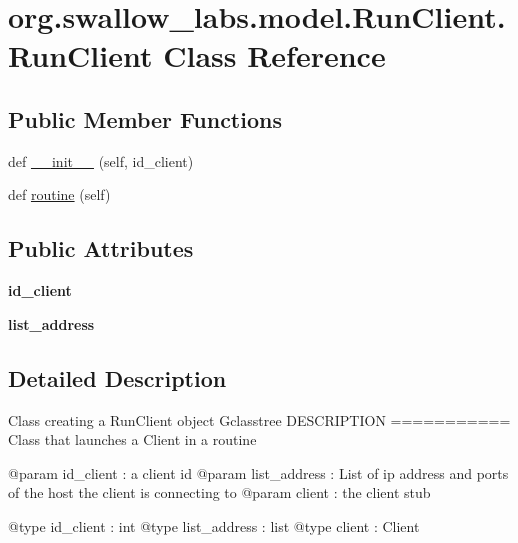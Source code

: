 \hypertarget{classorg_1_1swallow__labs_1_1model_1_1_run_client_1_1_run_client}{}\section{org.\+swallow\+\_\+labs.\+model.\+Run\+Client.\+Run\+Client Class Reference}
\label{classorg_1_1swallow__labs_1_1model_1_1_run_client_1_1_run_client}
\subsection*{Public Member Functions}
\begin{DoxyCompactItemize}
\item 
def \hyperlink{classorg_1_1swallow__labs_1_1model_1_1_run_client_1_1_run_client_a81ec48b20543e3646635882056c0e719}{\+\_\+\+\_\+init\+\_\+\+\_\+} (self, id\+\_\+client)
\item 
def \hyperlink{classorg_1_1swallow__labs_1_1model_1_1_run_client_1_1_run_client_ac0069ee35dc6fb476174bc36d9e6aa26}{routine} (self)
\end{DoxyCompactItemize}
\subsection*{Public Attributes}
\begin{DoxyCompactItemize}
\item 
\hypertarget{classorg_1_1swallow__labs_1_1model_1_1_run_client_1_1_run_client_a876ad6e3b9f3e77dd2862a89b6b920a3}{}{\bfseries id\+\_\+client}\label{classorg_1_1swallow__labs_1_1model_1_1_run_client_1_1_run_client_a876ad6e3b9f3e77dd2862a89b6b920a3}

\item 
\hypertarget{classorg_1_1swallow__labs_1_1model_1_1_run_client_1_1_run_client_ad4854628e4a05a680f45b9bd47de74d2}{}{\bfseries list\+\_\+address}\label{classorg_1_1swallow__labs_1_1model_1_1_run_client_1_1_run_client_ad4854628e4a05a680f45b9bd47de74d2}

\end{DoxyCompactItemize}


\subsection{Detailed Description}
\begin{DoxyVerb}    Class creating a RunClient object
    G{classtree}
    DESCRIPTION
    ===========
    Class that launches a Client in a routine

    @param id_client    : a client id
    @param list_address : List of ip address and ports of the host the client is connecting to
    @param client       : the client stub

    @type id_client     : int
    @type list_address  : list
    @type client        : Client\end{DoxyVerb}
 

